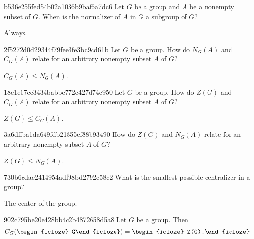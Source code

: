 \begin{note}{b536e255fed54b02a1036b9baf6a7dc6}
    Let \({ G }\) be a group and \({ A }\) be a nonempty subset of \({ G }\).
    When is the normalizer of \({ A }\) in \({ G }\) a subgroup of \({ G }\)?

    \begin{cloze}{1}
        Always.
    \end{cloze}
\end{note}

\begin{note}{2f5272d0d29344f79fee3fe3bc9cd61b}
    Let \({ G }\) be a group.
    How do \({ N_G(A) }\) and \({ C_G(A) }\) relate for an arbitrary nonempty subset \({ A }\) of \({ G }\)?

    \begin{cloze}{1}
        \({ C_G(A) \leq N_G(A) }\).
    \end{cloze}
\end{note}

\begin{note}{18e1e07cc3434babbe772c427d74c950}
    Let \({ G }\) be a group.
    How do \({ Z(G) }\) and \({ C_G(A) }\) relate for an arbitrary nonempty subset \({ A }\) of \({ G }\)?

    \begin{cloze}{1}
        \({ Z(G) \leq C_G(A) }\).
    \end{cloze}
\end{note}

\begin{note}{3a6dffba1da649fdb21855ef88b93490}
    How do \({ Z(G) }\) and \({ N_G(A) }\) relate for an arbitrary nonempty subset \({ A }\) of \({ G }\)?

    \begin{cloze}{1}
        \({ Z(G) \leq N_G(A) }\).
    \end{cloze}
\end{note}

\begin{note}{730b6cdac2414954adf98bd2792c58c2}
    What is the smallest possible centralizer in a group?

    \begin{cloze}{1}
        The center of the group.
    \end{cloze}
\end{note}

\begin{note}{902c795be20e428bb4c2b4872658d5a8}
    Let \({ G }\) be a group. Then
    \[
        C_G(\begin{icloze}{2}G\end{icloze}) = \begin{icloze}{1}Z(G).\end{icloze}
    \]
\end{note}

